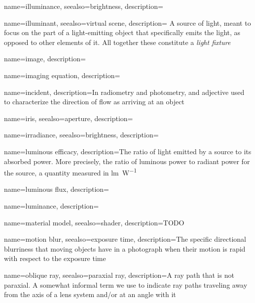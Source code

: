 {
	name=illuminance,
	seealso={brightness},
	description=\nopostdesc
}

{
	name=illuminant,
	seealso={virtual scene},
	description={
		A source of light, meant to focus on the part of a light-emitting object that
	    specifically emits the light, as opposed to other elements of it. All together
        these constitute a \textsl{light fixture}}
}

{
	name={image},
	description=\nopostdesc
}

{
	name={imaging equation},
	description=\nopostdesc
}
	
{
	name={incident},
	description={In radiometry and photometry, and adjective used to characterize the direction of
		flow as arriving at an object}
}

{
	name=iris,
	seealso={aperture},
	description=\nopostdesc
}

{
	name=irradiance,
	seealso={brightness},
	description=\nopostdesc
}

{
	name={luminous efficacy},
	description={The ratio of light emitted by a source to its absorbed power.
		More precisely, the ratio of luminous power to radiant power for the source,
		a quantity measured in \unit{\lumen\per\watt}}
}

{
	name={luminous flux},
	description=\nopostdesc
}

{
	name={luminance},
	description=\nopostdesc
}

{
	name={material model},
	seealso={shader},
	description={TODO}
}

{
	name={motion blur},
	seealso={exposure time},
	description={The specific directional blurriness that moving objects
		have in a photograph when their motion is rapid with respect 
		to the \gls{exposure time}}
}

{
	name={oblique ray},
	seealso={paraxial ray},
	description={A ray path that is not paraxial. 
		A somewhat informal term we use to indicate ray paths traveling
		away from the axis of a lens system and/or at an angle with it}
}

